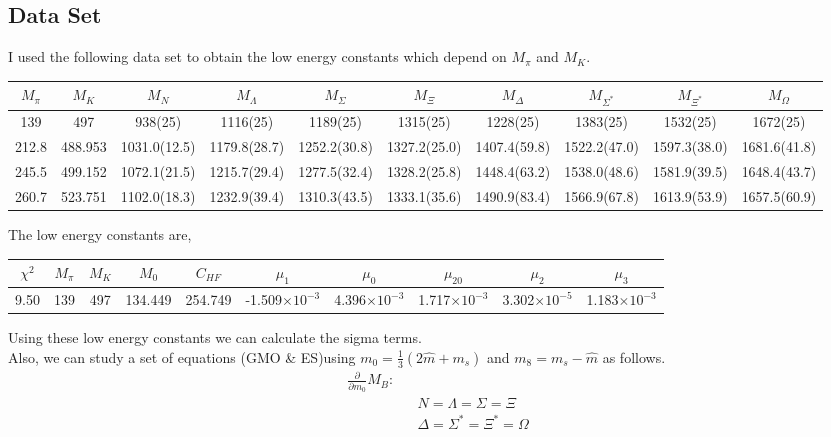 \documentclass[10pt,a4paper]{article}
\begin{document}
\subsection{Data Set}
I used the following data set to obtain the low energy constants which depend on $M_\pi$
 and $M_K$.
\begin{table}[h!]\small
	\begin{tabular}{cccccccccc}
		$M_{\pi}$ & $M_K$ & $M_N$ & $M_{\Lambda}$ & $M_{\Sigma}$ & $M_{\Xi}$ & $M_{\Delta}$ & $M_{\Sigma^*}$ & $M_{\Xi^*}$ & $M_{\Omega}$ \\ 
		\hline 139 & 497 & 938(25) & 1116(25) & 1189(25) & 1315(25) & 1228(25) & 1383(25) & 1532(25) & 1672(25) \\
		212.8 & 488.953 & 1031.0(12.5) & 1179.8(28.7) & 1252.2(30.8) & 1327.2(25.0) & 1407.4(59.8) & 1522.2(47.0) & 1597.3(38.0) & 1681.6(41.8) \\ 
		245.5 & 499.152 & 1072.1(21.5) & 1215.7(29.4) & 1277.5(32.4) & 1328.2(25.8) & 1448.4(63.2) & 1538.0(48.6) & 1581.9(39.5) & 1648.4(43.7) \\ 
		260.7 & 523.751  & 1102.0(18.3) & 1232.9(39.4) & 1310.3(43.5) & 1333.1(35.6) & 1490.9(83.4) & 1566.9(67.8) & 1613.9(53.9) & 1657.5(60.9) \\ 
		\hline
	\end{tabular} 
\end{table}
The low energy constants are,
\begin{table}[h!]
	\begin{tabular}{cccccccccc}
		$\chi^2$ & $M_\pi$ & $M_K$ & $M_0$ & $C_{HF}$ & $\mu_1$ & $\mu_0$ & $\mu_{20}$ & $\mu_2$ & $\mu_3$ \\
		\hline 9.50 & 139 & 497 & 134.449 & 254.749 & -1.509$\times 10^{-3}$ & 4.396$\times 10^{-3}$ & 1.717$\times 10^{-3}$ & 3.302$\times 10^{-5}$ & 1.183$\times 10^{-3}$ \\
	\end{tabular}	
\end{table}		

Using these low energy constants we can calculate the sigma terms. \\
Also, we can study a set of equations (GMO \& ES)using $m_0=\frac{1}{3}\left(2\hat{m}+m_s\right)$ and $m_8=m_s-\hat{m}$ as follows.
\begin{eqnarray}
\frac{\partial}{\partial m_0} M_B : & & \nonumber  \\
& &N=\Lambda=\Sigma=\Xi  \\
& & \Delta=\Sigma^*=\Xi^*=\Omega \nonumber
\end{eqnarray}
\end{document}
